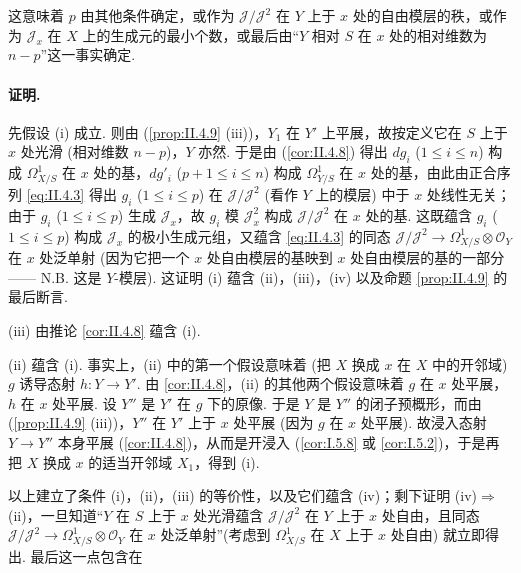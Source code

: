 \begin{remarkstar}
这意味着 $p$ 由其他条件确定，或作为 $\mathcal{J}/\mathcal{J}^2$ 在 $Y$ 上于 $x$ 处的自由模层的秩，或作为 $\mathcal{J}_x$ 在 $X$ 上的生成元的最小个数，或最后由``$Y$ 相对 $S$ 在 $x$ 处的相对维数为 $n - p$''这一事实确定.
\end{remarkstar}

\paragraph*{证明.} 先假设 (i) 成立. 则由 (\ref{prop:II.4.9} (iii))，$Y_1$ 在 $Y'$ 上平展，故按定义它在 $S$ 上于 $x$ 处光滑 (相对维数 $n - p$)，$Y$ 亦然. 于是由 (\cref{cor:II.4.8}) 得出 $dg_i$ ($1 \leqslant i \leqslant n$) 构成 $\varOmega_{X/S}^{1}$ 在 $x$ 处的基，$dg'_i$ ($p+1 \leqslant i \leqslant n$) 构成 $\varOmega_{Y/S}^{1}$ 在 $x$ 处的基，由此由正合序列 \eqref{eq:II.4.3} 得出 $g_i$ ($1 \leqslant i \leqslant p$) 在 $\mathcal{J}/\mathcal{J}^2$ (看作 $Y$ 上的模层) 中于 $x$ 处线性无关；由于 $g_i$ ($1 \leqslant i \leqslant p$) 生成 $\mathcal{J}_x$，故 $g_i$ 模 $\mathcal{J}_x^2$ 构成 $\mathcal{J}/\mathcal{J}^2$ 在 $x$ 处的基. 这既蕴含 $g_i$ ($1 \leqslant i \leqslant p$) 构成 $\mathcal{J}_x$ 的极小生成元组，又蕴含 \eqref{eq:II.4.3} 的同态 $\mathcal{J}/\mathcal{J}^2 \to \varOmega_{X/S}^{1} \otimes \mathcal{O}_Y$ 在 $x$ 处泛单射 (因为它把一个 $x$ 处自由模层的基映到 $x$ 处自由模层的基的一部分 —— N.B. 这是 $Y$-模层). 这证明 (i) 蕴含 (ii)，(iii)，(iv) 以及命题 \ref{prop:II.4.9} 的最后断言.

(iii) 由推论 \ref{cor:II.4.8} 蕴含 (i).

(ii) 蕴含 (i). 事实上，(ii) 中的第一个假设意味着 (把 $X$ 换成 $x$ 在 $X$ 中的开邻域) $g$ 诱导态射 $h \colon Y \to Y'$. 由 \ref{cor:II.4.8}，(ii) 的其他两个假设意味着 $g$ 在 $x$ 处平展，$h$ 在 $x$ 处平展. 设 $Y''$ 是 $Y'$ 在 $g$ 下的原像. 于是 $Y$ 是 $Y''$ 的闭子预概形，而由 (\ref{prop:II.4.9} (iii))，$Y''$ 在 $Y'$ 上于 $x$ 处平展 (因为 $g$ 在 $x$ 处平展). 故浸入态射 $Y \to Y''$ 本身平展 (\ref{cor:II.4.8})，从而是开浸入 (\ref{cor:I.5.8} 或 \ref{cor:I.5.2})，于是再把 $X$ 换成 $x$ 的适当开邻域 $X_1$，得到 (i).

以上建立了条件 (i)，(ii)，(iii) 的等价性，以及它们蕴含 (iv)；剩下证明 (iv)$\Rightarrow$(ii)，一旦知道``$Y$ 在 $S$ 上于 $x$ 处光滑蕴含 $\mathcal{J}/\mathcal{J}^2$ 在 $Y$ 上于 $x$ 处自由，且同态 $\mathcal{J}/\mathcal{J}^2 \to \varOmega_{X/S}^{1} \otimes \mathcal{O}_Y$ 在 $x$ 处泛单射''(考虑到 $\varOmega_{X/S}^{1}$ 在 $X$ 上于 $x$ 处自由) 就立即得出. 最后这一点包含在

